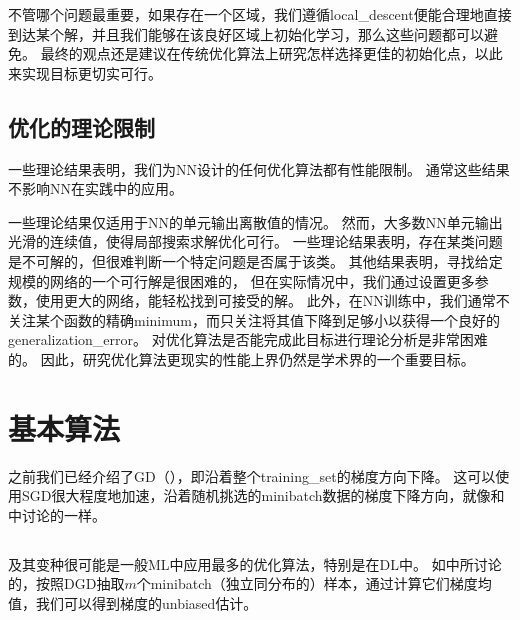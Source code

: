 
不管哪个问题最重要，如果存在一个区域，我们遵循\gls{local_descent}便能合理地直接到达某个解，并且我们能够在该良好区域上初始化学习，那么这些问题都可以避免。
最终的观点还是建议在传统优化算法上研究怎样选择更佳的初始化点，以此来实现目标更切实可行。


\subsection{优化的理论限制}
\label{sec:theoretical_limits_of_optimization}
一些理论结果表明，我们为\gls{NN}设计的任何优化算法都有性能限制\citep{Blum92,JuddBook,wolpert96no}。
通常这些结果不影响\gls{NN}在实践中的应用。


一些理论结果仅适用于\gls{NN}的单元输出离散值的情况。
然而，大多数\gls{NN}单元输出光滑的连续值，使得局部搜索求解优化可行。
一些理论结果表明，存在某类问题是不可解的，但很难判断一个特定问题是否属于该类。
其他结果表明，寻找给定规模的网络的一个可行解是很困难的，
但在实际情况中，我们通过设置更多参数，使用更大的网络，能轻松找到可接受的解。
此外，在\gls{NN}训练中，我们通常不关注某个函数的精确\gls{minimum}，而只关注将其值下降到足够小以获得一个良好的\gls{generalization_error}。
对优化算法是否能完成此目标进行理论分析是非常困难的。
因此，研究优化算法更现实的性能上界仍然是学术界的一个重要目标。



\section{基本算法}
\label{sec:basic_algorithms}
之前我们已经介绍了\gls{GD}（），即沿着整个\gls{training_set}的梯度方向下降。
这可以使用\gls{SGD}很大程度地加速，沿着随机挑选的\gls{minibatch}数据的梯度下降方向，就像和中讨论的一样。


\subsection{}
\label{sec:stochastic_gradient_descent_chap8}
及其变种很可能是一般\gls{ML}中应用最多的优化算法，特别是在\gls{DL}中。
如中所讨论的，按照\gls{DGD}抽取$m$个\gls{minibatch}（独立同分布的）样本，通过计算它们梯度均值，我们可以得到梯度的\gls{unbiased}估计。

